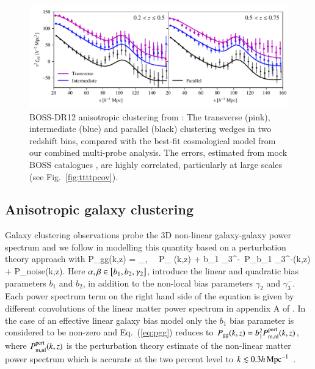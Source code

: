 \begin{figure}
\begin{centering}
        \includegraphics[width=\textwidth]{Data_Plots/clustering_wedges/BOSS_Sanchez_wedges.pdf}
        \caption{BOSS-DR12 anisotropic clustering from \citet{sanchez/etal:2017}:
          The transverse (pink), intermediate (blue) and parallel
          (black) clustering wedges in two redshift bins, compared 
          with the best-fit
          cosmological model from our combined multi-probe analysis.  The errors, estimated from mock BOSS catalogues \citep{kitaura/etal:2016}, are highly correlated, particularly at large scales (see Fig.~\ref{fig:ttttpcov}).}
        \label{fig:wedges}
        \end{centering}
\end{figure}


\subsection{Anisotropic galaxy clustering}
\label{sec:clustering}
Galaxy clustering observations probe the 3D non-linear galaxy-galaxy power spectrum and we follow \citet{sanchez/etal:2017} in modelling this quantity based on a perturbation theory approach with
\be
\label{eq:pgg}
P_{\rm gg}(k,z) = \sum_{\alpha,\beta} \alpha\, \beta\, P_{\alpha
  \beta}(k,z) + b_1 \gamma_3^-\, P_{b_1 \gamma_3^-}(k,z) + P_{\rm noise}(k,z)\;.
\ee
Here $\alpha,\beta \in \left[ b_1, b_2, \gamma_2 \right]$, introduce the linear and quadratic bias parameters $b_1$ and $b_2$, in addition to the non-local bias parameters $ \gamma_2$ and $\gamma_3^-$.  Each power spectrum term on the right hand side of the equation is given by different convolutions of the linear matter power spectrum in appendix A of \citet{sanchez/etal:2017}.   In the case of an effective linear galaxy bias model \citep[see for example][]{vanuitert/etal:2018, abbott/etal:2018} only the $b_1$ bias parameter is considered to be non-zero and Eq.~(\ref{eq:pgg}) reduces to $P_{\rm gg}(k,z) =b_1^2 P_{\rm m, nl}^{\rm pert}(k,z)$, where $P_{\rm m, nl}^{\rm pert}(k,z)$ is the perturbation theory estimate of the non-linear matter power spectrum which is accurate at the two percent level to $k \lesssim 0.3 h \,{\rm Mpc}^{-1}$ \citep{sanchez/etal:2017}. 

